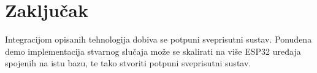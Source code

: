 \chapter{Zaključak}


Integracijom opisanih tehnologija dobiva se potpuni sveprisutni sustav. Ponuđena demo implementacija stvarnog slučaja može se skalirati na više ESP32 uređaja spojenih na istu bazu, te tako stvoriti potpuni sveprisutni sustav.

\eject